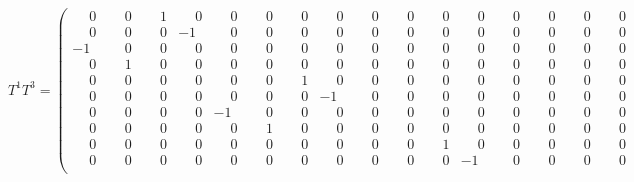 \documentclass[10pt]{article}
\begin{document}
\[
T^{1}T^{3} = \left(\begin{smallmatrix}
\phantom{-}0 & \phantom{-}0 & \phantom{-}1 & \phantom{-}0 & \phantom{-}0 & \phantom{-}0 & \phantom{-}0 & \phantom{-}0 & \phantom{-}0 & \phantom{-}0 & \phantom{-}0 & \phantom{-}0 & \phantom{-}0 & \phantom{-}0 & \phantom{-}0 & \phantom{-}0 \\
\phantom{-}0 & \phantom{-}0 & \phantom{-}0 & -1 & \phantom{-}0 & \phantom{-}0 & \phantom{-}0 & \phantom{-}0 & \phantom{-}0 & \phantom{-}0 & \phantom{-}0 & \phantom{-}0 & \phantom{-}0 & \phantom{-}0 & \phantom{-}0 & \phantom{-}0 \\
-1 & \phantom{-}0 & \phantom{-}0 & \phantom{-}0 & \phantom{-}0 & \phantom{-}0 & \phantom{-}0 & \phantom{-}0 & \phantom{-}0 & \phantom{-}0 & \phantom{-}0 & \phantom{-}0 & \phantom{-}0 & \phantom{-}0 & \phantom{-}0 & \phantom{-}0 \\
\phantom{-}0 & \phantom{-}1 & \phantom{-}0 & \phantom{-}0 & \phantom{-}0 & \phantom{-}0 & \phantom{-}0 & \phantom{-}0 & \phantom{-}0 & \phantom{-}0 & \phantom{-}0 & \phantom{-}0 & \phantom{-}0 & \phantom{-}0 & \phantom{-}0 & \phantom{-}0 \\
\phantom{-}0 & \phantom{-}0 & \phantom{-}0 & \phantom{-}0 & \phantom{-}0 & \phantom{-}0 & \phantom{-}1 & \phantom{-}0 & \phantom{-}0 & \phantom{-}0 & \phantom{-}0 & \phantom{-}0 & \phantom{-}0 & \phantom{-}0 & \phantom{-}0 & \phantom{-}0 \\
\phantom{-}0 & \phantom{-}0 & \phantom{-}0 & \phantom{-}0 & \phantom{-}0 & \phantom{-}0 & \phantom{-}0 & -1 & \phantom{-}0 & \phantom{-}0 & \phantom{-}0 & \phantom{-}0 & \phantom{-}0 & \phantom{-}0 & \phantom{-}0 & \phantom{-}0 \\
\phantom{-}0 & \phantom{-}0 & \phantom{-}0 & \phantom{-}0 & -1 & \phantom{-}0 & \phantom{-}0 & \phantom{-}0 & \phantom{-}0 & \phantom{-}0 & \phantom{-}0 & \phantom{-}0 & \phantom{-}0 & \phantom{-}0 & \phantom{-}0 & \phantom{-}0 \\
\phantom{-}0 & \phantom{-}0 & \phantom{-}0 & \phantom{-}0 & \phantom{-}0 & \phantom{-}1 & \phantom{-}0 & \phantom{-}0 & \phantom{-}0 & \phantom{-}0 & \phantom{-}0 & \phantom{-}0 & \phantom{-}0 & \phantom{-}0 & \phantom{-}0 & \phantom{-}0 \\
\phantom{-}0 & \phantom{-}0 & \phantom{-}0 & \phantom{-}0 & \phantom{-}0 & \phantom{-}0 & \phantom{-}0 & \phantom{-}0 & \phantom{-}0 & \phantom{-}0 & \phantom{-}1 & \phantom{-}0 & \phantom{-}0 & \phantom{-}0 & \phantom{-}0 & \phantom{-}0 \\
\phantom{-}0 & \phantom{-}0 & \phantom{-}0 & \phantom{-}0 & \phantom{-}0 & \phantom{-}0 & \phantom{-}0 & \phantom{-}0 & \phantom{-}0 & \phantom{-}0 & \phantom{-}0 & -1 & \phantom{-}0 & \phantom{-}0 & \phantom{-}0 & \phantom{-}0 \\

\end{smallmatrix}\]
\end{document}
